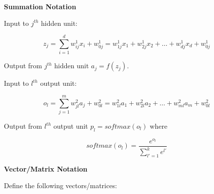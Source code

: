 \documentclass{article}
\begin{document}
\vspace{3mm}

\noindent
\textbf{Summation Notation}

\noindent
Input to $j^{th}$ hidden unit:

$$z_j = \sum_{i=1}^d w_{ij}^1 x_i + w_{0j}^1 = w_{1j}^1 x_1 + w_{2j}^1 x_2 + \dots + w_{dj}^1 x_d + w_{0j}^1$$

\noindent
Output from $j^{th}$ hidden unit $a_j = f(z_j)$.

\noindent
Input to $l^{th}$ output unit:

$$o_l = \sum_{j=1}^m w_{jl}^2 a_j + w_{0l}^2 = w_{1l}^2 a_1 + w_{2l}^2 a_2 + \dots + w_{ml}^2 a_m + w_{0l}^2$$

\noindent
Output from $l^{th}$ output unit $p_l = softmax(o_l)$ where

$$softmax(o_l) = \frac{e^{o_l}}{\sum_{l'=1}^k e^{l'}}$$

\vspace{3mm}

\noindent
\textbf{Vector/Matrix Notation}

\noindent
Define the following vectors/matrices:
\end{document}

